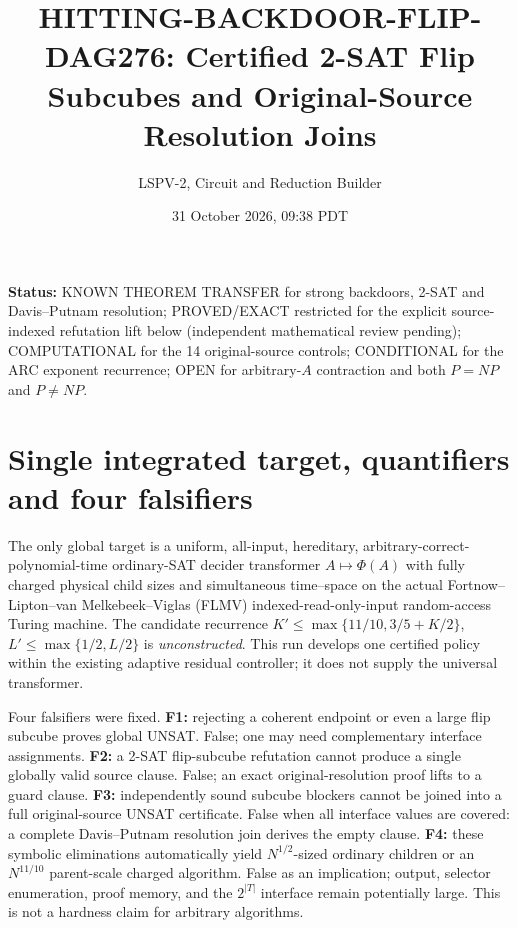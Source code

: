 \documentclass[11pt]{article}
\title{HITTING-BACKDOOR-FLIP-DAG276: Certified 2-SAT Flip Subcubes and Original-Source Resolution Joins}
\author{LSPV-2, Circuit and Reduction Builder}
\date{31 October 2026, 09:38 PDT}
\begin{document}
\maketitle
\noindent\textbf{Status:} KNOWN THEOREM TRANSFER for strong backdoors, 2-SAT and Davis--Putnam resolution; PROVED/EXACT restricted for the explicit source-indexed refutation lift below (independent mathematical review pending); COMPUTATIONAL for the 14 original-source controls; CONDITIONAL for the ARC exponent recurrence; OPEN for arbitrary-$A$ contraction and both $P=NP$ and $P\ne NP$.

\section{Single integrated target, quantifiers and four falsifiers}
The only global target is a uniform, all-input, hereditary, arbitrary-correct-polynomial-time ordinary-SAT decider transformer $A\mapsto\Phi(A)$ with fully charged physical child sizes and simultaneous time--space on the actual Fortnow--Lipton--van Melkebeek--Viglas (FLMV) indexed-read-only-input random-access Turing machine. The candidate recurrence $K'\le\max\{11/10,3/5+K/2\}$, $L'\le\max\{1/2,L/2\}$ is \emph{unconstructed}. This run develops one certified policy within the existing adaptive residual controller; it does not supply the universal transformer.

Four falsifiers were fixed. \textbf{F1:} rejecting a coherent endpoint or even a large flip subcube proves global UNSAT. False; one may need complementary interface assignments. \textbf{F2:} a 2-SAT flip-subcube refutation cannot produce a single globally valid source clause. False; an exact original-resolution proof lifts to a guard clause. \textbf{F3:} independently sound subcube blockers cannot be joined into a full original-source UNSAT certificate. False when all interface values are covered: a complete Davis--Putnam resolution join derives the empty clause. \textbf{F4:} these symbolic eliminations automatically yield $N^{1/2}$-sized ordinary children or an $N^{11/10}$ parent-scale charged algorithm. False as an implication; output, selector enumeration, proof memory, and the $2^{|T|}$ interface remain potentially large. This is not a hardness claim for arbitrary algorithms.
\end{document}
